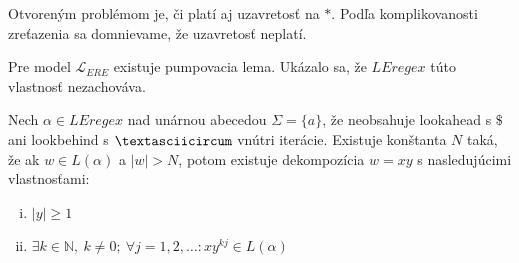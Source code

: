 \documentclass{svk_long_sk}
\def\N{\mathds{N}} %
\def\le{LEregex}
\def\el{\mathscr{L}_{ERE}}
\begin{document}
Otvoreným problémom je, či platí aj uzavretosť na $*$. Podľa komplikovanosti zreťazenia sa domnievame, že uzavretosť neplatí.

Pre model $\el$ existuje pumpovacia lema. Ukázalo sa, že $\le$ túto vlastnosť nezachováva.

\begin{theorem}
Nech $\alpha\in\le$ nad unárnou abecedou $\Sigma = \lbrace a \rbrace$, že neobsahuje lookahead s $\mathdollar$ ani lookbehind s $\textasciicircum$ vnútri iterácie. Existuje konštanta $N$ taká, že ak $w \in L(\alpha)$ a $\vert w \vert > N$, potom existuje dekompozícia $w=xy$ s nasledujúcimi vlastnosťami:
\begin{enumerate}[(i)]
\item $\vert y \vert \geq 1$
\item $\exists k \in \N,~k\neq 0;~\forall j = 1,2,\ldots: xy^{kj} \in L(\alpha)$
\end{enumerate}
\end{theorem}
\end{document}
